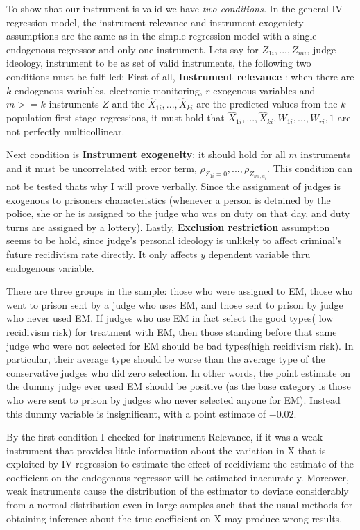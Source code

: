 \documentclass[a4paper,12pt]{article}
\begin{document}
To show that our instrument is valid we have\textit{ two conditions.} In the general IV regression model, the instrument relevance and instrument exogeniety assumptions are the same as in the simple regression model with a single endogenous regressor and only one instrument. Lets say for $Z_{1i},...,Z_{mi}$, judge ideology, instrument to be as set of valid instruments, the following two conditions must be fulfilled: First of all, \textbf{Instrument relevance} : when there are $k$ endogenous variables, electronic monitoring, $r$ exogenous variables and $m >= k$ instruments $Z$ and the $\widehat{X}_{1i} ,..., \widehat{X}_{ki}$ are the predicted values from the  $k$ population first stage regressions, it must hold that $\widehat{X}_{1i} ,..., \widehat{X}_{ki}, W_{1i},...,W_{ri}, 1$ are not perfectly multicollinear. 

Next condition is \textbf{Instrument exogeneity}: it should hold for all $m$ instruments  and it must be uncorrelated with error term, $\rho_{Z_{1i} = 0} ,..., \rho_{Z_{mi,u_i}}$. This condition can not be tested thats why I will prove verbally. Since the assignment of judges is exogenous to prisoners characteristics (whenever a person is detained by the police, she or he is assigned to the judge who was on duty on that day, and duty turns are assigned by a lottery). Lastly, \textbf{Exclusion restriction} assumption seems to be hold, since judge's personal ideology is unlikely to affect criminal's future recidivism rate directly. It only affects $y$ dependent variable thru endogenous variable. 

There are three groups in the sample: those who were assigned to EM, those who went to prison sent by a judge who uses EM, and those sent to prison by judge who never used EM. If judges who use EM in fact select the good types( low recidivism risk) for treatment with EM, then those standing before that same judge who were not selected for EM should be bad types(high recidivism risk). In particular, their average type should be worse than the average type of the conservative judges who did zero selection. In other words, the point estimate on the dummy judge ever used EM should be positive (as the base category is those who were sent to prison by judges who never selected anyone for EM). Instead this dummy variable is insignificant, with a point estimate of $-0.02$. 

By the first condition I checked for Instrument Relevance, if it was a weak instrument that provides little information about the variation in X that is exploited by IV regression to estimate the effect of recidivism: the estimate of the coefficient on the endogenous regressor will be  estimated inaccurately. Moreover, weak instruments cause the distribution of the estimator to deviate considerably from a normal distribution even in large samples such that the usual methods for obtaining inference about the true coefficient on  X may produce wrong results. 
\end{document}

